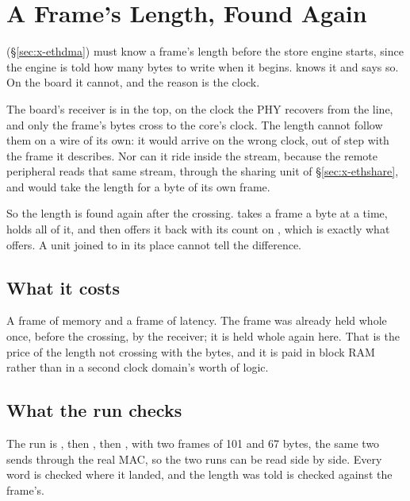 \section{A Frame's Length, Found Again}
\label{sec:x-framelen}

 (\S\ref{sec:x-ethdma}) must know a frame's length
before the store engine starts, since the engine is told how many
bytes to write when it begins.  knows it and says so. On
the board it cannot, and the reason is the clock.

The board's receiver is in the top, on the clock the PHY recovers from
the line, and only the frame's bytes cross to the core's clock. The
length cannot follow them on a wire of its own: it would arrive on the
wrong clock, out of step with the frame it describes. Nor can it ride
inside the stream, because the remote peripheral reads that same
stream, through the sharing unit of \S\ref{sec:x-ethshare}, and would
take the length for a byte of its own frame.

So the length is found again after the crossing.  takes
a frame a byte at a time, holds all of it, and then offers it back with
its count on , which is exactly what  offers. A
unit joined to  in its place cannot tell the difference.



\subsection{What it costs}

A frame of memory and a frame of latency. The frame was already held
whole once, before the crossing, by the receiver; it is held whole
again here. That is the price of the length not crossing with the
bytes, and it is paid in block RAM rather than in a second clock
domain's worth of logic.

\subsection{What the run checks}

The run is , then , then ,
with two frames of 101 and 67 bytes, the same two 
sends through the real MAC, so the two runs can be read side by side.
Every word is checked where it landed, and the length 
was told is checked against the frame's.

